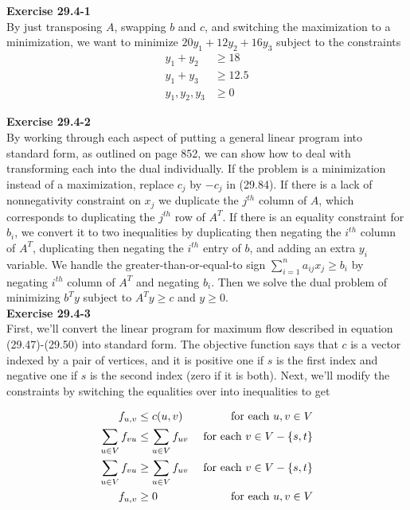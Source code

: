 \documentclass{article}
\begin{document}
\noindent\textbf{Exercise 29.4-1}\\

By just transposing $A$, swapping $b$ and $c$, and switching the maximization to a minimization, we want to minimize $20y_1 + 12 y_2 + 16 y_3$ subject to the constraints 
\begin{align*}
y_1 + y_2 &\ge 18\\
y_1 + y_3 &\ge 12.5\\
y_1,y_2,y_3 &\ge 0
\end{align*}

\noindent\textbf{Exercise 29.4-2}\\

By working through each aspect of putting a general linear program into standard form, as outlined on page 852, we can show how to deal with transforming each into the dual individually.  If the problem is a minimization instead of a maximization, replace $c_j$ by $-c_j$ in (29.84).  If there is a lack of nonnegativity constraint on $x_j$ we duplicate the $j^{th}$ column of $A$, which corresponds to duplicating the $j^{th}$ row of $A^T$.  If there is an equality constraint for $b_i$, we convert it to two inequalities by duplicating then negating the $i^{th}$ column of $A^T$, duplicating then negating the $i^{th}$ entry of $b$, and adding an extra $y_i$ variable.  We handle the greater-than-or-equal-to sign $\sum_{i=1}^n a_{ij}x_j \geq b_i$ by negating $i^{th}$ column of $A^T$ and negating $b_i$.  Then we solve the dual problem of minimizing $b^Ty$ subject to $A^Ty \geq c$ and $y \geq 0$.  \\

\noindent\textbf{Exercise 29.4-3}\\

First, we'll convert the linear program for maximum flow described in equation (29.47)-(29.50) into standard form. The objective function says that $c$ is a vector indexed by a pair of vertices, and it is positive one if $s$ is the first index and negative one if $s$ is the second index (zero if it is both). Next, we'll modify the constraints by switching the equalities over into inequalities to get

\begin{align*}
f_{u,v} &\le c(u,v) &\hbox{ for each $u,v\in V$}\\
\sum_{u\in V} f_{vu} &\le \sum_{u\in V} f_{uv}  &\hbox{ for each $v\in V - \{s,t\}$}\\
\sum_{u\in V} f_{vu} &\ge \sum_{u\in V} f_{uv}  &\hbox{ for each $v\in V - \{s,t\}$}\\
f_{u,v} &\ge 0 &\hbox{ for each $u,v\in V$}\\
\end{align*}
\end{document}
